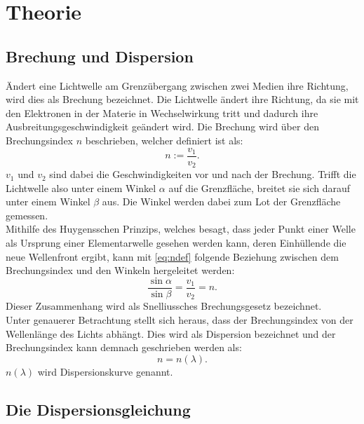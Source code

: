 
\section{Theorie}
\label{sec:Theorie}

\subsection{Brechung und Dispersion}

Ändert eine Lichtwelle am Grenzübergang zwischen zwei Medien ihre Richtung, wird dies als Brechung bezeichnet. Die Lichtwelle ändert ihre Richtung, da sie mit den Elektronen in der Materie in Wechselwirkung tritt und dadurch ihre Ausbreitungsgeschwindigkeit geändert wird. Die Brechung wird über den Brechungsindex $n$ beschrieben, welcher definiert ist als:
\begin{equation}
n := \frac{v_1}{v_2}\text{.} \label{eq:ndef}
\end{equation}
$v_1$ und $v_2$ sind dabei die Geschwindigkeiten vor und nach der Brechung. 
Trifft die Lichtwelle also unter einem Winkel $\alpha$ auf die Grenzfläche, breitet sie sich darauf unter einem Winkel $\beta$ aus. Die Winkel werden dabei zum Lot der Grenzfläche gemessen.\\
Mithilfe des Huygensschen Prinzips, welches besagt, dass jeder Punkt einer Welle als Ursprung einer Elementarwelle gesehen werden kann, deren Einhüllende die neue Wellenfront ergibt, kann mit \eqref{eq:ndef} folgende Beziehung zwischen dem Brechungsindex und den Winkeln hergeleitet werden:
\begin{equation}
\frac{\sin\alpha}{\sin\beta} = \frac{v_1}{v_2} = n\text{.} \label{eq:Snellius}
\end{equation}
Dieser Zusammenhang wird als Snelliussches Brechungsgesetz bezeichnet.\\
Unter genauerer Betrachtung stellt sich heraus, dass der Brechungsindex von der Wellenlänge des Lichts abhängt. Dies wird als Dispersion bezeichnet und der Brechungsindex kann demnach geschrieben werden als:
\[n = n(\lambda)\text{.}\] 
$n(\lambda)$ wird Dispersionskurve genannt.

\subsection{Die Dispersionsgleichung}

